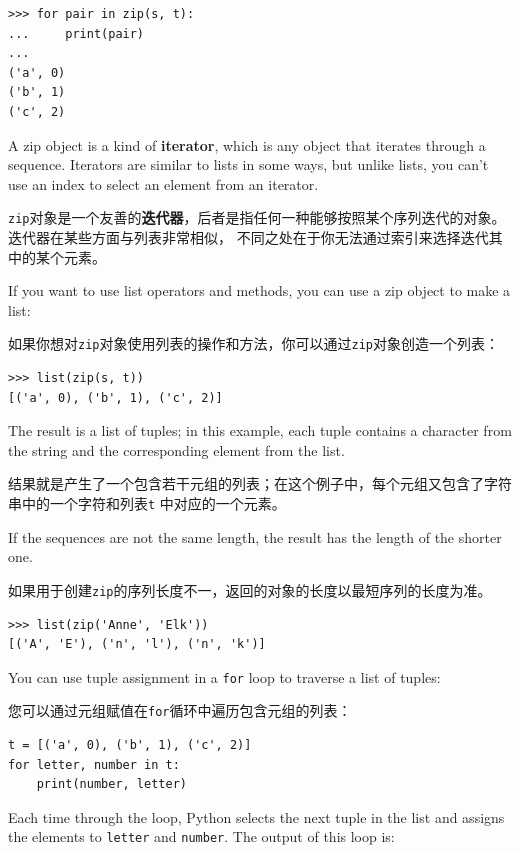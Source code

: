 \begin{lstlisting}
>>> for pair in zip(s, t):
...     print(pair)
...
('a', 0)
('b', 1)
('c', 2)
\end{lstlisting}

%
A zip object is a kind of {\bf iterator}, which is any object
that iterates through a sequence.  Iterators are similar to lists in some
ways, but unlike lists, you can't use an index to select an element from
an iterator.

\lstinline{zip}对象是一个友善的\textbf{迭代器}，后者是指任何一种能够按照某个序列迭代的对象。 迭代器在某些方面与列表非常相似， 不同之处在于你无法通过索引来选择迭代其中的某个元素。
 

If you want to use list operators and methods, you can
use a zip object to make a list:

如果你想对\lstinline {zip}对象使用列表的操作和方法，你可以通过\lstinline {zip}对象创造一个列表：

\begin{lstlisting}
>>> list(zip(s, t))
[('a', 0), ('b', 1), ('c', 2)]
\end{lstlisting}

%
The result is a list of tuples; in this example, each tuple contains
a character from the string and the corresponding element from
the list.

结果就是产生了一个包含若干元组的列表；在这个例子中，每个元组又包含了字符串中的一个字符和列表\lstinline {t} 中对应的一个元素。

If the sequences are not the same length, the result has the
length of the shorter one.

如果用于创建\lstinline{zip}的序列长度不一，返回的对象的长度以最短序列的长度为准。

\begin{lstlisting}
>>> list(zip('Anne', 'Elk'))
[('A', 'E'), ('n', 'l'), ('n', 'k')]
\end{lstlisting}
%
You can use tuple assignment in a {\tt for} loop to traverse a list of
tuples:

您可以通过元组赋值在\lstinline{for}循环中遍历包含元组的列表：
  

\begin{lstlisting}
t = [('a', 0), ('b', 1), ('c', 2)]
for letter, number in t:
    print(number, letter)
\end{lstlisting}
%
Each time through the loop, Python selects the next tuple in
the list and assigns the elements to {\tt letter} and
{\tt number}.  The output of this loop is:

